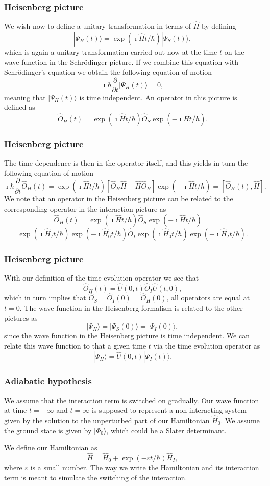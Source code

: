 \frame
{
\frametitle{Heisenberg picture}
\begin{small}
{\scriptsize
We wish now to define a unitary transformation in terms of $\hat{H}$ by defining
\[
|\Psi_H(t)\rangle = \exp{(\imath\hat{H}t/\hbar)}|\Psi_S(t)\rangle,
\]
which is again a unitary transformation carried out now at the time $t$ on the 
wave function in the Schr\"odinger picture. If we combine this equation with 
Schr\"odinger's equation we obtain the following equation of motion
\[
\imath \hbar\frac{\partial }{\partial t}|\Psi_H(t)\rangle = 0,
\]
meaning that $|\Psi_H(t)\rangle$ is time independent. An operator in this picture is defined as
\[
\hat{O}_H(t)=
\exp{(\imath\hat{H}t/\hbar)}\hat{O}_S\exp{(-\imath\hat{H}t/\hbar)}.
\]
}
\end{small}
}
\frame
{
\frametitle{Heisenberg picture}
\begin{small}
{\scriptsize
The time dependence is then in the operator itself, and this yields in turn the
following equation of motion
\[
\imath \hbar\frac{\partial }{\partial t}\hat{O}_H(t) = \exp{(\imath\hat{H}t/\hbar)}\left[\hat{O}_H\hat{H}-\hat{H}\hat{O}_H\right]\exp{(-\imath\hat{H}t/\hbar)}=\left[\hat{O}_H(t),\hat{H}\right].
\]
We note that an operator in the Heisenberg picture can be related to the corresponding
operator in the interaction picture as 
\[
\hat{O}_H(t)=
\exp{(\imath\hat{H}t/\hbar)}\hat{O}_S\exp{(-\imath\hat{H}t/\hbar)}=\]
\[
\exp{(\imath\hat{H}_It/\hbar)}\exp{(-\imath\hat{H}_0t/\hbar)}\hat{O}_I\exp{(\imath\hat{H}_0t/\hbar)}\exp{(-\imath\hat{H}_It/\hbar)}.
\]
}
\end{small}
}
\frame
{
\frametitle{Heisenberg picture}
\begin{small}
{\scriptsize
With our definition of the time evolution operator we see that
\[
\hat{O}_H(t)=\hat{U}(0,t)\hat{O}_I\hat{U}(t,0),
\]
which in turn implies that $\hat{O}_S=\hat{O}_I(0)=\hat{O}_H(0)$, all operators are equal at $t=0$. The wave function in the Heisenberg formalism is 
related to the other pictures as 
\[
|\Psi_H\rangle=|\Psi_S(0)\rangle=|\Psi_I(0)\rangle,
\]
since the wave function in the Heisenberg picture is time independent. 
We can relate this wave function to that a given time $t$ via the time evolution operator as
\[
|\Psi_H\rangle=\hat{U}(0,t)|\Psi_I(t)\rangle.
\]
}
\end{small}
}



\frame
{
\frametitle{Adiabatic hypothesis}
\begin{small}
{\scriptsize
We assume that the interaction term is switched on gradually. Our wave function at time $t=-\infty$ and $t=\infty$ is supposed to represent a non-interacting system
given by the solution to the unperturbed part of our Hamiltonian $\hat{H}_0$.
We assume the ground state is given by $|\Phi_0\rangle$, which could be a Slater determinant.

We define our Hamiltonian as
\[
\hat{H}=\hat{H}_0+\exp{(-\varepsilon t/\hbar)}\hat{H}_I,
\]
where $\varepsilon$ is a small number. The way we write the Hamiltonian 
and its interaction term is meant to simulate the switching of the interaction.
}
\end{small}
}


